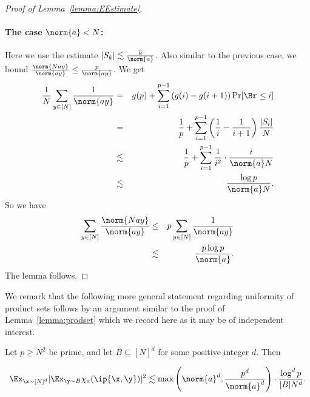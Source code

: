 \begin{proof}[Proof of Lemma~\ref{lemma:EEstimate}]
\paragraph{The case $ \norm{a} < N$:}

Here we use the estimate $|S_k|\lesssim \frac{k}{\norm{a}}$. Also similar to the previous case, we bound $\frac{\norm{Nay}}{\norm{ay}}\leq \frac{p}{\norm{ay}}$.
We get
	\begin{eqnarray*}
\frac{1}{N}	\sum_{y \in [N]} \frac{1}{\norm{ay}}
		&=& g(p)+ \sum_{i=1}^{p-1} \left(g(i)-g(i+1)\right) \Pr[\Br  \leq i]\\
		&=& \frac{1}{p} + \sum_{i=1}^{p-1} \left(\frac{1}{i}-\frac{1}{i+1}\right) \frac{|S_i|}{N}\\
		&\lesssim& \frac{1}{p} + \sum_{i=1}^{p-1} \frac{1}{i^2} \cdot \frac{i}{\norm{a} N}\\
		&\lesssim&\frac{\log p}{\norm{a}N}.
  \end{eqnarray*}
  So we have
\begin{eqnarray*}
	\sum_{y \in [N]} \frac{\norm{Nay}}{\norm{ay}}
	&\leq& p\sum_{y \in [N]} \frac{1}{\norm{ay}}\\
	&\lesssim& \frac{p\log p}{\norm{a}}.
  \end{eqnarray*}
The lemma follows.
%
%
%
%
%
%
%
%
%
%
%
%
\end{proof}

We remark that the following more general statement regarding uniformity of product sets follows by %
an argument similar to the proof of %
%
%
%
Lemma~\ref{lemma:prodset} which we record here as it may be of independent interest.

\begin{lemma}\label{lemma:genprodset}
 Let $p \ge  N^2$ be prime, and  let $B \subseteq [N]^d$ for some positive integer $d$. Then
	
$$	 \Ex_{\x \sim [N]^d}  |\Ex_{\y \sim B} \chi_a(\ip{\x,\y })|^2  \lesssim \max\left(\norm{a}^d,\frac{p^d }{\norm{a}^d}\right) \cdot \frac{ \log^d p}{|B|N^d}.$$
\end{lemma}


